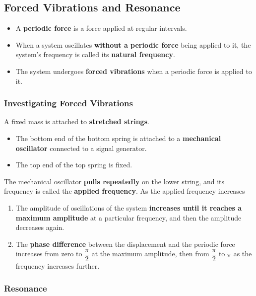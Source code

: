\subsection{Forced Vibrations and Resonance}

\begin{itemize}
    \item A \textbf{periodic force} is a force applied at regular intervals.
    \item When a system oscillates \textbf{without a periodic force} being applied to it, the system's frequency is called its \textbf{natural frequency}.
    \item The system undergoes \textbf{forced vibrations} when a periodic force is applied to it.
\end{itemize}

\subsubsection*{Investigating Forced Vibrations}

A fixed mass is attached to \textbf{stretched strings}.
\begin{itemize}
    \item The bottom end of the bottom spring is attached to a \textbf{mechanical oscillator} connected to a signal generator.
    \item The top end of the top spring is fixed.
\end{itemize}

The mechanical oscillator \textbf{pulls repeatedly} on the lower string, and its frequency is called the \textbf{applied frequency}. As the applied frequency increases

\begin{enumerate}
    \item The amplitude of oscillations of the system \textbf{increases until it reaches a maximum amplitude} at a particular frequency, and then the amplitude decreases again.
    \item The \textbf{phase difference} between the displacement and the periodic force increases from zero to $\dfrac{\pi}{2}$ at the maximum amplitude, then from $\dfrac{\pi}{2}$ to $\pi$ as the frequency increases further.
\end{enumerate}

\subsubsection*{Resonance}

